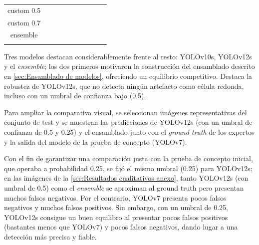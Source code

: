 \documentclass[12pt,a4paper,onecolumn,oneside]{report}
\begin{document}
\begin{table}[ht]
{\begin{tabular}{!{\vrule width 1.2pt}c|c|c|c|c|c|c|c|c|c!{\vrule width 1.2pt}}
\hline
custom 0.5        &  &  &  &  &  &  &  &  &  \\
\hline
custom 0.7        &  &  &  &  &  &  &  &  &  \\
\hline
ensemble       &  &  &  &  &  &  &  &  &  \\
\hline
\end{tabular}
}
\label{tab:resultados_artefactos}
\end{table}

Tres modelos destacan considerablemente frente al resto: YOLOv10s, YOLOv12s y el \textit{ensemble}; los dos primeros motivaron la construcción del ensamblado descrito en 
\autoref{sec:Ensamblado de modelos}, ofreciendo un equilibrio competitivo. Destaca la robustez de YOLOv12s, que no detecta ningún artefacto como célula redonda, incluso con un umbral de confianza bajo (0.5).

Para ampliar la comparativa visual, se seleccionan imágenes representativas del conjunto de test y se muestran las predicciones de YOLOv12s (con un umbral de confianza de 0.5 y 0.25) y el ensamblado junto con el
\textit{ground truth} de los expertos y la salida del modelo de la prueba de concepto (YOLOv7). 

Con el fin de garantizar una comparación justa con la prueba de concepto inicial, que operaba a probabilidad 0.25, se fijó el mismo umbral (0.25) para YOLOv12s; 
en las imágenes de la \autoref{sec:Resultados cualitativos anexo}, tanto YOLOv12s (con umbral de 0.5) como el \textit{ensemble} se aproximan al ground truth pero presentan muchos falsos negativos. Por el contrario, YOLOv7 presenta pocos falsos negativos y muchos falsos positivos.
Sin embargo, con un umbral de 0.25, YOLOv12s consigue un buen equilibro al presentar pocos falsos positivos (bastantes menos que YOLOv7) y pocos falsos negativos, dando lugar a una detección más precisa y fiable.
\end{document}
